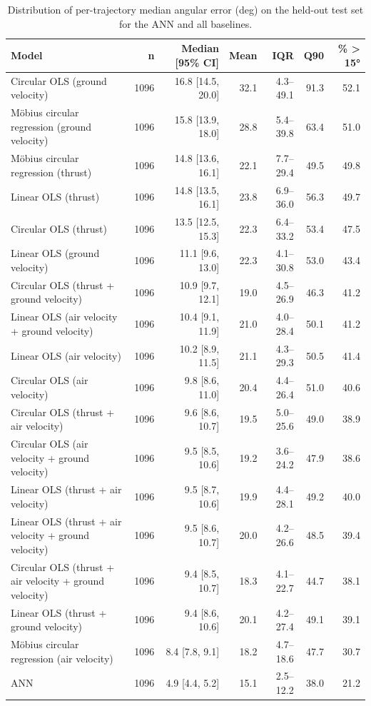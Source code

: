 \begin{table}[h!]
    \centering
    \caption{Distribution of per-trajectory median angular error (deg) on the held-out test set for the ANN and all baselines.}
    \label{tab:error_distribution}
    \begin{tabular}{@{}lrrrrrr@{}}
        \toprule
        Model & n & Median [95\% CI] & Mean & IQR & Q90 & \% > 15° \\
        \midrule
        Circular OLS (ground velocity) & 1096 & 16.8 [14.5, 20.0] & 32.1 & 4.3–49.1 & 91.3 & 52.1 \\
        Möbius circular regression (ground velocity) & 1096 & 15.8 [13.9, 18.0] & 28.8 & 5.4–39.8 & 63.4 & 51.0 \\
        Möbius circular regression (thrust) & 1096 & 14.8 [13.6, 16.1] & 22.1 & 7.7–29.4 & 49.5 & 49.8 \\
        Linear OLS (thrust) & 1096 & 14.8 [13.5, 16.1] & 23.8 & 6.9–36.0 & 56.3 & 49.7 \\
        Circular OLS (thrust) & 1096 & 13.5 [12.5, 15.3] & 22.3 & 6.4–33.2 & 53.4 & 47.5 \\
        Linear OLS (ground velocity) & 1096 & 11.1 [9.6, 13.0] & 22.3 & 4.1–30.8 & 53.0 & 43.4 \\
        Circular OLS (thrust + ground velocity) & 1096 & 10.9 [9.7, 12.1] & 19.0 & 4.5–26.9 & 46.3 & 41.2 \\
        Linear OLS (air velocity + ground velocity) & 1096 & 10.4 [9.1, 11.9] & 21.0 & 4.0–28.4 & 50.1 & 41.2 \\
        Linear OLS (air velocity) & 1096 & 10.2 [8.9, 11.5] & 21.1 & 4.3–29.3 & 50.5 & 41.4 \\
        Circular OLS (air velocity) & 1096 & 9.8 [8.6, 11.0] & 20.4 & 4.4–26.4 & 51.0 & 40.6 \\
        Circular OLS (thrust + air velocity) & 1096 & 9.6 [8.6, 10.7] & 19.5 & 5.0–25.6 & 49.0 & 38.9 \\
        Circular OLS (air velocity + ground velocity) & 1096 & 9.5 [8.5, 10.6] & 19.2 & 3.6–24.2 & 47.9 & 38.6 \\
        Linear OLS (thrust + air velocity) & 1096 & 9.5 [8.7, 10.6] & 19.9 & 4.4–28.1 & 49.2 & 40.0 \\
        Linear OLS (thrust + air velocity + ground velocity) & 1096 & 9.5 [8.6, 10.7] & 20.0 & 4.2–26.6 & 48.5 & 39.4 \\
        Circular OLS (thrust + air velocity + ground velocity) & 1096 & 9.4 [8.5, 10.7] & 18.3 & 4.1–22.7 & 44.7 & 38.1 \\
        Linear OLS (thrust + ground velocity) & 1096 & 9.4 [8.6, 10.6] & 20.1 & 4.2–27.4 & 49.1 & 39.1 \\
        Möbius circular regression (air velocity) & 1096 & 8.4 [7.8, 9.1] & 18.2 & 4.7–18.6 & 47.7 & 30.7 \\
        ANN & 1096 & 4.9 [4.4, 5.2] & 15.1 & 2.5–12.2 & 38.0 & 21.2 \\
        \bottomrule
    \end{tabular}
\end{table}
